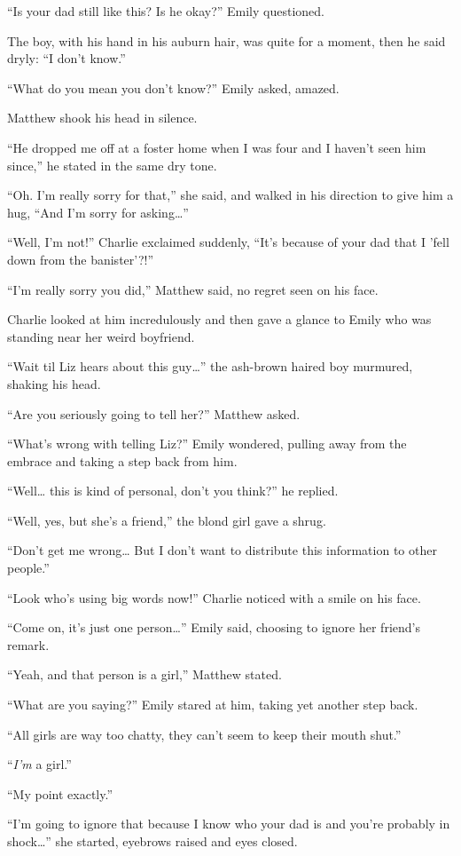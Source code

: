“Is your dad still like this? Is he okay?” Emily questioned.

The boy, with his hand in his auburn hair, was quite for a moment, then he said dryly: “I don't know.”

“What do you mean you don't know?” Emily asked, amazed.

Matthew shook his head in silence.

“He dropped me off at a foster home when I was four and I haven't seen him since,” he stated in the same dry tone.

“Oh. I'm really sorry for that,” she said, and walked in his direction to give him a hug, “And I'm sorry for asking…”

“Well, I'm not!” Charlie exclaimed suddenly, “It's because of your dad that I 'fell down from the banister'?!”

“I'm really sorry you did,” Matthew said, no regret seen on his face.

Charlie looked at him incredulously and then gave a glance to Emily who was standing near her weird boyfriend.

“Wait til Liz hears about this guy…” the ash-brown haired boy murmured, shaking his head.

“Are you seriously going to tell her?” Matthew asked.

“What's wrong with telling Liz?” Emily wondered, pulling away from the embrace and taking a step back from him.

“Well… this is kind of personal, don't you think?” he replied.

“Well, yes, but she's a friend,” the blond girl gave a shrug.

“Don't get me wrong… But I don't want to distribute this information to other people.”

“Look who's using big words now!” Charlie noticed with a smile on his face.

“Come on, it's just one person…” Emily said, choosing to ignore her friend's remark.

“Yeah, and that person is a girl,” Matthew stated.

“What are you saying?” Emily stared at him, taking yet another step back.

“All girls are way too chatty, they can't seem to keep their mouth shut.”

“\textit{I'm} a girl.”

“My point exactly.”

“I'm going to ignore that because I know who your dad is and you're probably in shock…” she started, eyebrows raised and eyes closed.

